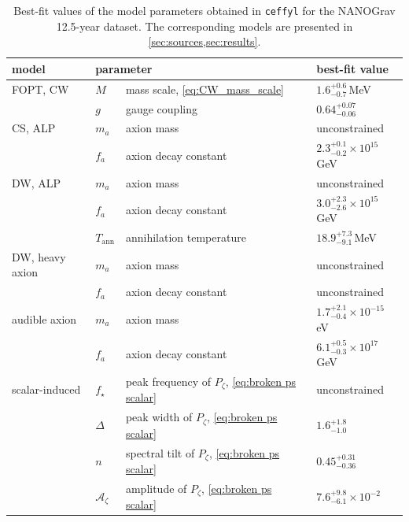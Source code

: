 \documentclass{article}
\begin{document}
\begin{table}
    \centering
    \begin{tabular}{llll}
        \hline\hline
        {\bf{model}} & \multicolumn{2}{l}{\bf{parameter}} & {\bf{best-fit value}}\\\hline
        FOPT, CW & $M$ & mass scale, \cref{eq:CW_mass_scale} & $1.6_{-0.7}^{+0.6}$\,\si{\MeV}\\
            & $g$ & gauge coupling & $0.64_{-0.06}^{+0.07}$ \\
        \hline
        CS, ALP & $m_a$ & axion mass & unconstrained \\
            & $f_a$ & axion decay constant & $2.3_{-0.2}^{+0.1} \times 10^{15}$\,\si{\GeV} \\
        \hline
        DW, ALP & $m_a$ & axion mass & unconstrained \\
            & $f_a$ & axion decay constant & $3.0_{-2.6}^{+2.3} \times 10^{15}$\,\si{\GeV} \\
            & $T_{\mathrm{ann}}$ & annihilation temperature & $18.9_{-9.1}^{+7.3}$\,\si{\MeV} \\
        \hline
        DW, heavy axion & $m_a$ & axion mass & unconstrained \\
            & $f_a$ & axion decay constant & unconstrained \\
        \hline
        audible axion & $m_a$ & axion mass & $1.7_{-0.4}^{+2.1} \times 10^{-15}$\,\si{\eV} \\
            & $f_a$ & axion decay constant & $6.1_{-0.3}^{+0.5} \times 10^{17}$\,\si{\GeV} \\
        \hline
        scalar-induced & $f_\star$ & peak frequency of $P_\zeta$, \cref{eq:broken ps scalar} & unconstrained \\
            & $\Delta$ & peak width of $P_\zeta$, \cref{eq:broken ps scalar} & $1.6_{-1.0}^{+1.8}$ \\
            & $n$ & spectral tilt  of $P_\zeta$, \cref{eq:broken ps scalar}& $0.45_{-0.36}^{+0.31}$ \\
            & $\mathcal{A}_\zeta$ & amplitude  of $P_\zeta$, \cref{eq:broken ps scalar}& $7.6_{-6.1}^{+9.8} \times 10^{-2}$ \\
        \hline\hline
    \end{tabular}
    \caption{%
        Best-fit values of the model parameters obtained in \texttt{ceffyl} for the NANOGrav 12.5-year dataset. The corresponding models are presented in \cref{sec:sources,sec:results}. 
    }
    \label{tab:bestfits}
\end{table}
\end{document}
